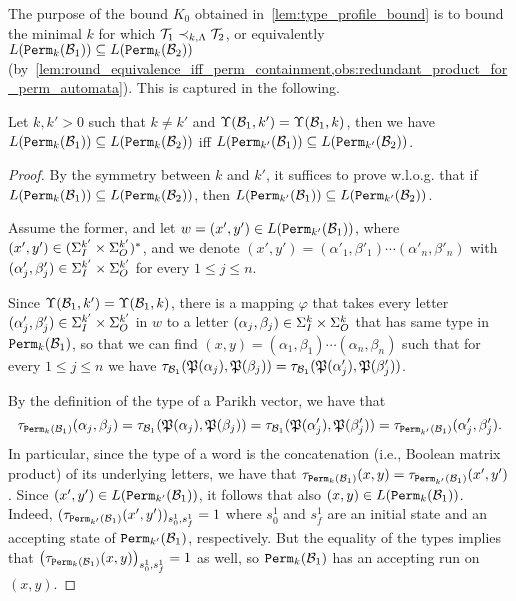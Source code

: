 The purpose of the bound $K_0$ obtained in~\cref{lem:type_profile_bound} is to bound the minimal $k$ for which $\mathcal{T}_1\prec_{k,\Lambda} \mathcal{T}_2$, or equivalently $L({\mathtt{Perm}}_{k}(\mathcal{B}_1))\subseteq L({\mathtt{Perm}}_{k}(\mathcal{B}_2))$ (by~\cref{lem:round_equivalence_iff_perm_containment,obs:redundant_product_for_perm_automata}).
This is captured in the following.

\begin{lemma}
	\label{lem:profile_equality_to_simulation}
	Let $k,k'>0$ such that $k\neq k'$ and $\Upsilon(\mathcal{B}_1,k')=\Upsilon(\mathcal{B}_1,k)$, then we have
	$L({\mathtt{Perm}}_{k}(\mathcal{B}_1))\subseteq L({\mathtt{Perm}}_{k}(\mathcal{B}_2))$ iff $L({\mathtt{Perm}}_{k'}(\mathcal{B}_1))\subseteq L({\mathtt{Perm}}_{k'}(\mathcal{B}_2))$.
\end{lemma}
\begin{proof}

By the symmetry between $k$ and $k'$, it suffices to prove w.l.o.g. that if $L({\mathtt{Perm}}_{k}(\mathcal{B}_1))\subseteq L({\mathtt{Perm}}_{k}(\mathcal{B}_2))$, then $L({\mathtt{Perm}}_{k'}(\mathcal{B}_1))\subseteq L({\mathtt{Perm}}_{k'}(\mathcal{B}_2))$.

Assume the former, and let $w=(x',y')\in L({\mathtt{Perm}}_{k'}(\mathcal{B}_1))$, where $(x',y')\in (\Sigma_{I}^{k'}\times \Sigma_{O}^{k'})^*$, and we denote $(x',y')=(\alpha'_1,\beta'_1)\cdots (\alpha'_n,\beta'_n)$ with $(\alpha'_j,\beta'_j)\in \Sigma_{I}^{k'}\times \Sigma_{O}^{k'}$ for every $1\le j\le n$. 

Since $\Upsilon(\mathcal{B}_1,k')=\Upsilon(\mathcal{B}_1,k)$, there is a mapping $\varphi$ that takes every letter $(\alpha_j',\beta_j')\in \Sigma_{I}^{k'}\times \Sigma_{O}^{k'}$ in $w$ to a letter $(\alpha_j,\beta_j)\in\Sigma_{I}^{k}\times \Sigma_{O}^{k}$ that has same type in ${\mathtt{Perm}}_{k}(\mathcal{B}_1)$, so that we can find $(x,y)=(\alpha_1,\beta_1)\cdots (\alpha_n,\beta_n)$ such that for every $1\le j\le n$ we have $\tau_{\mathcal{B}_1}(\mathfrak{P}(\alpha_j),\mathfrak{P}(\beta_j))=\tau_{\mathcal{B}_1}(\mathfrak{P}(\alpha'_j),\mathfrak{P}(\beta'_j))$. 

By the definition of the type of a Parikh vector, we have that \[\tau_{{\mathtt{Perm}}_k(\mathcal{B}_1)}(\alpha_j,\beta_j)=\tau_{\mathcal{B}_1}(\mathfrak{P}(\alpha_j),\mathfrak{P}(\beta_j))=\tau_{\mathcal{B}_1}(\mathfrak{P}(\alpha'_j),\mathfrak{P}(\beta'_j))=\tau_{{\mathtt{Perm}}_{k'}(\mathcal{B}_1)}(\alpha'_j,\beta'_j).\]
In particular, since the type of a word is the concatenation (i.e., Boolean matrix product) of its underlying letters, we have that $\tau_{{\mathtt{Perm}}_k(\mathcal{B}_1)}(x,y)=\tau_{{\mathtt{Perm}}_{k'}(\mathcal{B}_1)}(x',y')$. Since $(x',y')\in L({\mathtt{Perm}}_{k'}(\mathcal{B}_1))$, it follows that also $(x,y)\in L({\mathtt{Perm}}_{k}(\mathcal{B}_1))$. Indeed, 
$(\tau_{{\mathtt{Perm}}_{k'}(\mathcal{B}_1)}(x',y'))_{s^1_0,s^1_f}=1$ where $s^1_0$ and $s^1_f$ are an initial state and an accepting state of ${\mathtt{Perm}}_{k'}(\mathcal{B}_1)$, respectively. But the equality of the types implies that $\left(\tau_{{\mathtt{Perm}}_{k}(\mathcal{B}_1)}(x,y)\right)_{s^1_0,s^1_f}=1$ as well, so ${\mathtt{Perm}}_k(\mathcal{B}_1)$ has an accepting run on $(x,y)$.


\end{proof}
